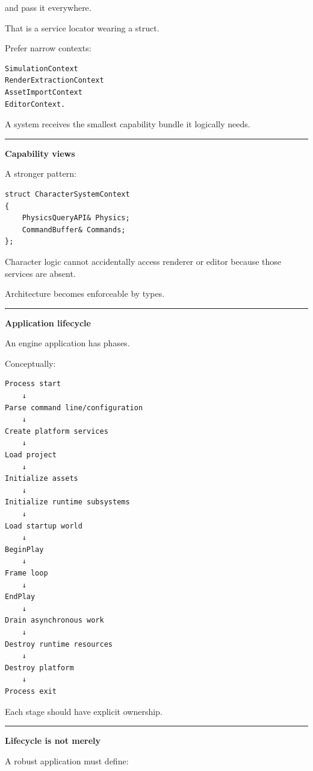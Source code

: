and pass it everywhere.

That is a service locator wearing a struct.

Prefer narrow contexts:

\begin{verbatim}
SimulationContext
RenderExtractionContext
AssetImportContext
EditorContext.
\end{verbatim}

A system receives the smallest capability bundle it logically needs.

\begin{center}\rule{0.5\linewidth}{0.5pt}\end{center}

\textbf{Capability views}

A stronger pattern:

\begin{verbatim}
struct CharacterSystemContext
{
    PhysicsQueryAPI& Physics;
    CommandBuffer& Commands;
};
\end{verbatim}

Character logic cannot accidentally access renderer or editor because those services are absent.

Architecture becomes enforceable by types.

\begin{center}\rule{0.5\linewidth}{0.5pt}\end{center}

\textbf{Application lifecycle}

An engine application has phases.

Conceptually:

\begin{verbatim}
Process start
    ↓
Parse command line/configuration
    ↓
Create platform services
    ↓
Load project
    ↓
Initialize assets
    ↓
Initialize runtime subsystems
    ↓
Load startup world
    ↓
BeginPlay
    ↓
Frame loop
    ↓
EndPlay
    ↓
Drain asynchronous work
    ↓
Destroy runtime resources
    ↓
Destroy platform
    ↓
Process exit
\end{verbatim}

Each stage should have explicit ownership.

\begin{center}\rule{0.5\linewidth}{0.5pt}\end{center}

\textbf{Lifecycle is not merely }

A robust application must define:

